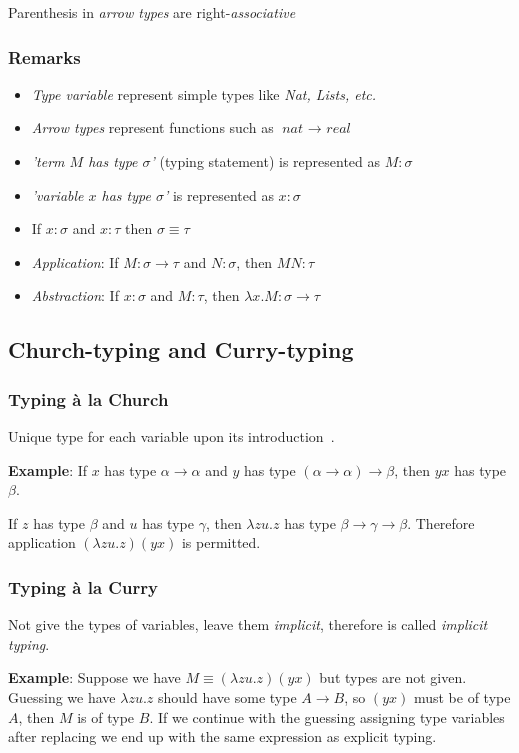 \documentclass[12pt, a4paper]{article}
\begin{document}
Parenthesis in \textit{arrow types} are right-\textit{associative}

\subsubsection{Remarks}
\begin{itemize}
    \item \textit{Type variable} represent simple types like \textit{Nat, Lists, etc.}
    \item \textit{Arrow types} represent functions such as $\textit{nat } \to \textit{ real}$
    \item \textit{'term $M$ has type $\sigma$'} (typing statement) is represented as $M : \sigma$
    \item \textit{'variable $x$ has type $\sigma$'} is represented as $x : \sigma$
    \item If $x : \sigma$ and $x : \tau$ then $\sigma \equiv \tau$
    \item \textit{Application}: If $M : \sigma \to \tau$ and $N : \sigma$, then $MN : \tau$ 
    \item \textit{Abstraction}: If $x : \sigma$ and $M : \tau$, then $\lambda x. M : \sigma \to \tau$ 
\end{itemize}

\subsection{Church-typing and Curry-typing}
\subsubsection{Typing à la Church}
Unique type for each variable upon its introduction~\cite{church}.

\textbf{Example}: If $x$ has type $\alpha \to \alpha$ and $y$ has type $(\alpha \to \alpha) \to \beta$, then $yx$ has type $\beta$.

If $z$ has type $\beta$ and $u$ has type $\gamma$, then $\lambda zu.z$ has type $\beta \to \gamma \to \beta$.
Therefore application $(\lambda zu.z)(yx)$ is permitted.

\subsubsection{Typing à la Curry}
Not give the types of variables, leave them \textit{implicit}, therefore is called \textit{implicit typing}.

\textbf{Example}: Suppose we have $M \equiv (\lambda zu.z)(yx)$ but types are not given. 
Guessing we have $\lambda zu.z$ should have some type $A \to B$, so $(yx)$ must be of type $A$, then $M$ is of type $B$.
If we continue with the guessing assigning type variables after replacing we end up with the same expression as explicit typing.
\end{document}
